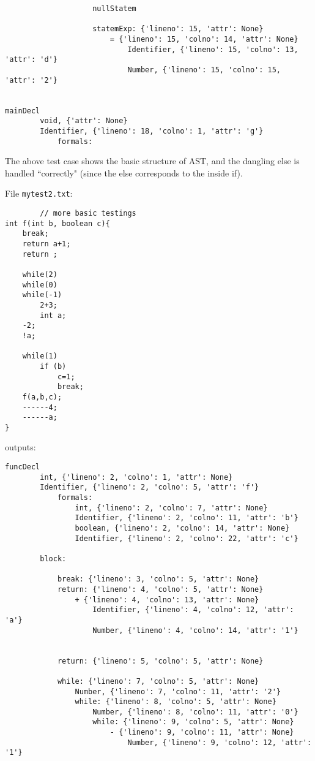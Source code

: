 \documentclass{article}
\begin{document}
\begin{itemize}
\begin{verbatim}
                    nullStatem

                    statemExp: {'lineno': 15, 'attr': None}
                        = {'lineno': 15, 'colno': 14, 'attr': None}
                            Identifier, {'lineno': 15, 'colno': 13, 'attr': 'd'}
                            Number, {'lineno': 15, 'colno': 15, 'attr': '2'}


mainDecl
        void, {'attr': None}
        Identifier, {'lineno': 18, 'colno': 1, 'attr': 'g'}
            formals:
        \end{verbatim}
        The above test case shows the basic structure of AST, and the dangling else is handled ``correctly" (since the else corresponds to the inside if).

        File \verb|mytest2.txt|:
        \begin{verbatim}
        // more basic testings
int f(int b, boolean c){
    break;
    return a+1;
    return ;

    while(2)
    while(0)
    while(-1)
        2+3;
        int a;
    -2;
    !a;

    while(1)
        if (b)
            c=1;
            break;
    f(a,b,c);
    ------4;
    ------a;
}
        \end{verbatim}
        outputs:
        \begin{verbatim}
funcDecl
        int, {'lineno': 2, 'colno': 1, 'attr': None}
        Identifier, {'lineno': 2, 'colno': 5, 'attr': 'f'}
            formals:
                int, {'lineno': 2, 'colno': 7, 'attr': None}
                Identifier, {'lineno': 2, 'colno': 11, 'attr': 'b'}
                boolean, {'lineno': 2, 'colno': 14, 'attr': None}
                Identifier, {'lineno': 2, 'colno': 22, 'attr': 'c'}

        block:

            break: {'lineno': 3, 'colno': 5, 'attr': None}
            return: {'lineno': 4, 'colno': 5, 'attr': None}
                + {'lineno': 4, 'colno': 13, 'attr': None}
                    Identifier, {'lineno': 4, 'colno': 12, 'attr': 'a'}
                    Number, {'lineno': 4, 'colno': 14, 'attr': '1'}


            return: {'lineno': 5, 'colno': 5, 'attr': None}

            while: {'lineno': 7, 'colno': 5, 'attr': None}
                Number, {'lineno': 7, 'colno': 11, 'attr': '2'}
                while: {'lineno': 8, 'colno': 5, 'attr': None}
                    Number, {'lineno': 8, 'colno': 11, 'attr': '0'}
                    while: {'lineno': 9, 'colno': 5, 'attr': None}
                        - {'lineno': 9, 'colno': 11, 'attr': None}
                            Number, {'lineno': 9, 'colno': 12, 'attr': '1'}


\end{verbatim}
\end{itemize}
\end{document}

